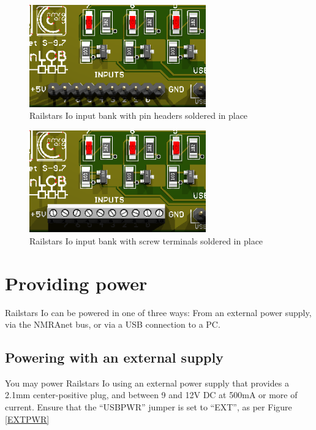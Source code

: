 \documentclass[12pt]{book}
\begin{document}
\begin{figure}[htbp]
\begin{center}
\includegraphics[width=3in]{images/IoInputPinheader.png}
\caption{Railstars Io input bank with pin headers soldered in place}
\label{pinheader}
\end{center}
\end{figure}

\begin{figure}[htbp]
\begin{center}
\includegraphics[width=3in]{images/IoInputsWithScrewTerminal.png}
\caption{Railstars Io input bank with screw terminals soldered in place}
\label{screwterminal}
\end{center}
\end{figure}

\section{Providing power}

Railstars Io can be powered in one of three ways: From an external power supply, via the NMRAnet bus, or via a USB connection to a PC.

\subsection{Powering with an external supply}
\label{externalpower}

You may power Railstars Io using an external power supply that provides a 2.1mm center-positive plug, and between 9 and 12V DC at 500mA or more of current. Ensure that the ``USBPWR'' jumper is set to ``EXT'', as per Figure \ref{EXTPWR}
\end{document}
